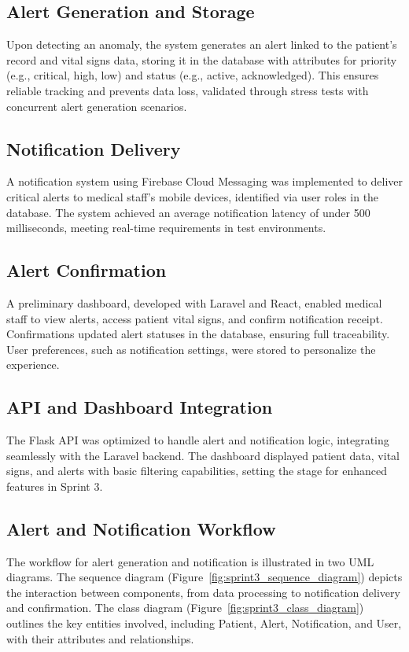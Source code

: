 \subsection{Alert Generation and Storage}
Upon detecting an anomaly, the system generates an alert linked to the patient’s record and vital signs data, storing it in the database with attributes for priority (e.g., critical, high, low) and status (e.g., active, acknowledged). This ensures reliable tracking and prevents data loss, validated through stress tests with concurrent alert generation scenarios.

\subsection{Notification Delivery}
A notification system using Firebase Cloud Messaging was implemented to deliver critical alerts to medical staff’s mobile devices, identified via user roles in the database. The system achieved an average notification latency of under 500 milliseconds, meeting real-time requirements in test environments.

\subsection{Alert Confirmation}
A preliminary dashboard, developed with Laravel and React, enabled medical staff to view alerts, access patient vital signs, and confirm notification receipt. Confirmations updated alert statuses in the database, ensuring full traceability. User preferences, such as notification settings, were stored to personalize the experience.

\subsection{API and Dashboard Integration}
The Flask API was optimized to handle alert and notification logic, integrating seamlessly with the Laravel backend. The dashboard displayed patient data, vital signs, and alerts with basic filtering capabilities, setting the stage for enhanced features in Sprint 3.

\subsection{Alert and Notification Workflow}
The workflow for alert generation and notification is illustrated in two UML diagrams. The sequence diagram (Figure~\ref{fig:sprint3_sequence_diagram}) depicts the interaction between components, from data processing to notification delivery and confirmation. The class diagram (Figure~\ref{fig:sprint3_class_diagram}) outlines the key entities involved, including Patient, Alert, Notification, and User, with their attributes and relationships.

